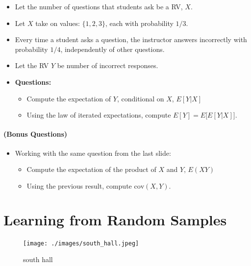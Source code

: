 \documentclass[
]{book}
\providecommand{\tightlist}{%
  \setlength{\itemsep}{0pt}\setlength{\parskip}{0pt}}
\theoremstyle{definition}
\theoremstyle{definition}
\theoremstyle{definition}
\theoremstyle{definition}
\theoremstyle{remark}
\begin{document}
\begin{itemize}
\item
  Let the number of questions that students ask be a RV, \(X\).\\
\item
  Let \(X\) take on values: \(\{1, 2, 3\}\), each with probability \(1/3\).\\
\item
  Every time a student asks a question, the instructor answers incorrectly with probability \(1/4\), independently of other questions.
\item
  Let the RV \(Y\) be number of incorrect responses.
\item
  \textbf{Questions:}

  \begin{itemize}
  \tightlist
  \item
    Compute the expectation of \(Y\), conditional on \(X\), \(E[Y|X]\)
  \item
    Using the law of iterated expectations, compute \(E[Y] = E\big[E[Y|X]\big]\).
  \end{itemize}
\end{itemize}

\hypertarget{bonus-questions}{%
\subsubsection{(Bonus Questions)}\label{bonus-questions}}

\begin{itemize}
\tightlist
\item
  Working with the same question from the last slide:

  \begin{itemize}
  \tightlist
  \item
    Compute the expectation of the product of \(X\) and \(Y\), \(E(XY)\)
  \item
    Using the previous result, compute \(\text{cov}(X,Y)\).
  \end{itemize}
\end{itemize}

\hypertarget{learning-from-random-samples}{%
\chapter{Learning from Random Samples}\label{learning-from-random-samples}}

\begin{figure}
\centering
\texttt{[image: ./images/south\_hall.jpeg]}
\caption{south hall}
\end{figure}
\end{document}
